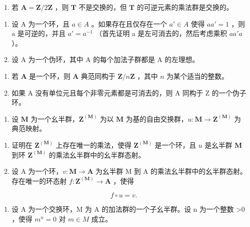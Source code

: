 \begin{enumerate}
\def\labelenumi{(\alph{enumi})}
\setcounter{enumi}{3}
\tightlist
\item
  若 \(\mathbf{A} = \mathbf{Z} / 2\mathbf{Z}\) ，则 \(\mathbf{T}\) 不是交换的，但 \(\mathbf{T}\) 的可逆元素的乘法群是交换的。
\end{enumerate}

\begin{enumerate}
\def\labelenumi{\arabic{enumi}.}
\setcounter{enumi}{2}
\item
  设 A 为一个环，且 \(a \in A\) 。如果存在且仅存在一个 \(a' \in A\) 使得 \(aa' = 1\) ，则 a 是可逆的，并且 \(a' = a^{-1}\) （首先证明 a 是左可消去的，然后考虑乘积 \(aa'a\)）。
\item
  设 A 为一个伪环，其中 A 的每个加法子群都是 A 的左理想。
\end{enumerate}

\begin{enumerate}
\def\labelenumi{(\alph{enumi})}
\item
  若 \(\mathbf{A}\) 是一个环，则 \(\mathbf{A}\) 典范同构于 \(\mathbf{Z} / n\mathbf{Z}\) ，其中 \(n\) 为某个适当的整数。
\item
  如果 A 没有单位元且每个非零元素都是可消去的，则 A 同构于 Z 的一个伪子环。
\end{enumerate}

\begin{enumerate}
\def\labelenumi{\arabic{enumi}.}
\setcounter{enumi}{4}
\tightlist
\item
  设 \(\mathbf{M}\) 为一个幺半群，\(\mathbf{Z}^{(\mathbf{M})}\) 为以 \(\mathbf{M}\) 为基的自由交换群，\(u\colon \mathbf{M}\to \mathbf{Z}^{(\mathbf{M})}\) 为典范映射。
\end{enumerate}

\begin{enumerate}
\def\labelenumi{(\alph{enumi})}
\item
  证明在 \(\mathbf{Z}^{(\mathbf{M})}\) 上存在唯一的乘法，使得 \(\mathbf{Z}^{(\mathbf{M})}\) 是一个环，且 \(u\) 是幺半群 \(\mathbf{M}\) 到环 \(\mathbf{Z}^{(\mathbf{M})}\) 的乘法幺半群中的幺半群态射。
\item
  设 A 为一个环，\(v: \mathbf{M} \to \mathbf{A}\) 为幺半群 M 到 A 的乘法幺半群中的幺半群态射。存在唯一的环态射 \(f: \mathbf{Z}^{(\mathbf{M})} \to \mathbf{A}\) ，使得
\end{enumerate}

\[
f \circ u = v.
\]

\begin{enumerate}
\def\labelenumi{\arabic{enumi}.}
\setcounter{enumi}{5}
\tightlist
\item
  设 A 为一个交换环，M 为 A 的加法群的一个子幺半群。设 n 为一个整数 \textgreater0 ，使得 \(m^{n} = 0\) 对 \(m \in M\) 成立。
\end{enumerate}

